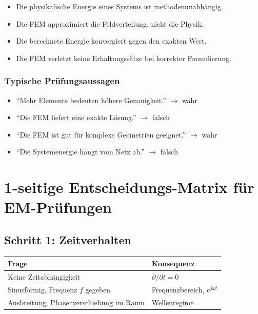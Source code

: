 \documentclass[a4paper]{article}
\newcommand{\imp}[1]{{\color{accent}\bfseries #1}}
\begin{document}
\begin{itemize}
    \item Die physikalische Energie eines Systems ist methodenunabh\"angig.
    \item Die FEM approximiert die Feldverteilung, nicht die Physik.
    \item Die berechnete Energie konvergiert gegen den exakten Wert.
    \item Die FEM verletzt keine Erhaltungss\"atze bei korrekter Formulierung.
\end{itemize}

\subsubsection*{Typische Pr\"ufungsaussagen}

\begin{itemize}
    \item ``Mehr Elemente bedeuten h\"ohere Genauigkeit.'' $\rightarrow$ wahr
    \item ``Die FEM liefert eine exakte L\"osung.'' $\rightarrow$ falsch
    \item ``Die FEM ist gut f\"ur komplexe Geometrien geeignet.'' $\rightarrow$ wahr
    \item ``Die Systemenergie h\"angt vom Netz ab.'' $\rightarrow$ falsch
\end{itemize}


\section{1-seitige Entscheidungs-Matrix für EM-Prüfungen}
\vspace{4pt}

\subsection*{Schritt 1: Zeitverhalten}

\begin{schema}
\begin{tabular}{p{4cm} p{10cm}}
\imp{Frage} & \imp{Konsequenz} \\ \hline
Keine Zeitabhängigkeit & $\partial/\partial t=0$ \\
Sinusförmig, Frequenz $f$ gegeben & Frequenzbereich, $e^{j\omega t}$ \\
Ausbreitung, Phasenverschiebung im Raum & Wellenregime \\
\end{tabular}
\end{schema}
\end{document}
